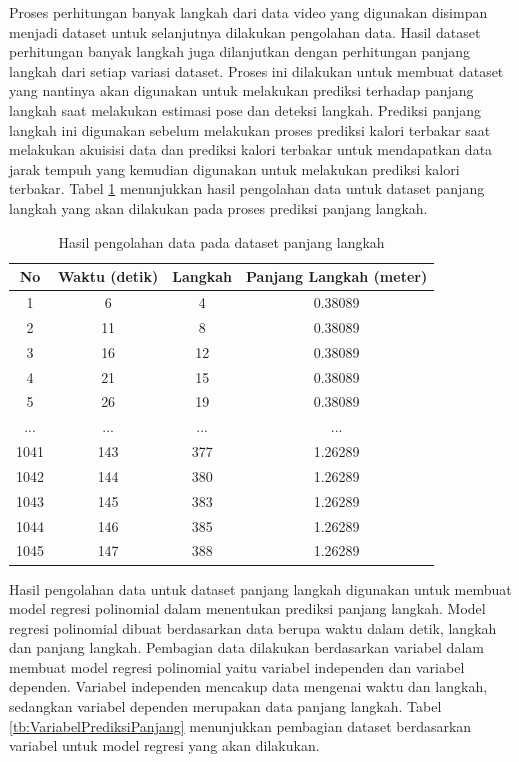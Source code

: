 Proses perhitungan banyak langkah dari data video yang digunakan disimpan menjadi dataset untuk selanjutnya dilakukan pengolahan data. Hasil dataset perhitungan banyak langkah juga dilanjutkan dengan perhitungan panjang langkah dari setiap variasi dataset. Proses ini dilakukan untuk membuat dataset yang nantinya akan digunakan untuk melakukan prediksi terhadap panjang langkah saat melakukan estimasi pose dan deteksi langkah. Prediksi panjang langkah ini digunakan sebelum melakukan proses prediksi kalori terbakar saat melakukan akuisisi data dan prediksi kalori terbakar untuk mendapatkan data jarak tempuh yang kemudian digunakan untuk melakukan prediksi kalori terbakar. Tabel \ref{tb:OlahDatasetPanjang} menunjukkan hasil pengolahan data untuk dataset panjang langkah yang akan dilakukan pada proses prediksi panjang langkah.

\begin{longtable}{|c|c|c|c|}
  \caption{Hasil pengolahan data pada dataset panjang langkah}
  \label{tb:OlahDatasetPanjang}                                   \\
  \hline
  \rowcolor[HTML]{C0C0C0}
  \textbf{No} & \textbf{Waktu (detik)} & \textbf{Langkah} & \textbf{Panjang Langkah (meter)} \\
  \hline
  1   & 6    & 4    & 0.38089      \\
  \hline
  2   & 11    & 8    & 0.38089     \\
  \hline
  3   & 16    & 12    & 0.38089     \\
  \hline
  4   & 21    & 15    & 0.38089     \\
  \hline
  5   & 26    & 19    & 0.38089     \\
  \hline
  ...   & ...    & ...    & ...     \\
  \hline
  1041   & 143    & 377    & 1.26289     \\
  \hline
  1042   & 144    & 380    & 1.26289     \\
  \hline
  1043   & 145    & 383    & 1.26289     \\
  \hline
  1044   & 146    & 385    & 1.26289     \\
  \hline
  1045   & 147    & 388    & 1.26289     \\
  \hline
\end{longtable}

Hasil pengolahan data untuk dataset panjang langkah digunakan untuk membuat model regresi polinomial dalam menentukan prediksi panjang langkah. Model regresi polinomial dibuat berdasarkan data berupa waktu dalam detik, langkah dan panjang langkah. Pembagian data dilakukan berdasarkan variabel dalam membuat model regresi polinomial yaitu variabel independen dan variabel dependen. Variabel independen mencakup data mengenai waktu dan langkah, sedangkan variabel dependen merupakan data panjang langkah. Tabel \ref{tb:VariabelPrediksiPanjang} menunjukkan pembagian dataset berdasarkan variabel untuk model regresi yang akan dilakukan.

